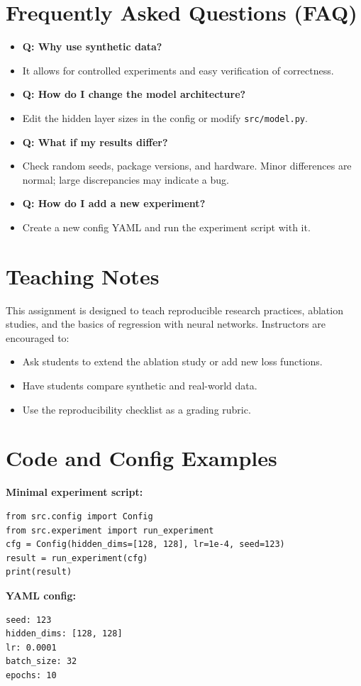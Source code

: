 \documentclass[11pt]{article}
\begin{document}
\section*{Frequently Asked Questions (FAQ)}
\begin{itemize}
  \item \textbf{Q: Why use synthetic data?}
  \item[A:] It allows for controlled experiments and easy verification of correctness.
  \item \textbf{Q: How do I change the model architecture?}
  \item[A:] Edit the hidden layer sizes in the config or modify \texttt{src/model.py}.
  \item \textbf{Q: What if my results differ?}
  \item[A:] Check random seeds, package versions, and hardware. Minor differences are normal; large discrepancies may indicate a bug.
  \item \textbf{Q: How do I add a new experiment?}
  \item[A:] Create a new config YAML and run the experiment script with it.
\end{itemize}

\section*{Teaching Notes}
This assignment is designed to teach reproducible research practices, ablation studies, and the basics of regression with neural networks. Instructors are encouraged to:
\begin{itemize}
  \item Ask students to extend the ablation study or add new loss functions.
  \item Have students compare synthetic and real-world data.
  \item Use the reproducibility checklist as a grading rubric.
\end{itemize}

\section*{Code and Config Examples}
\textbf{Minimal experiment script:}
\begin{verbatim}
from src.config import Config
from src.experiment import run_experiment
cfg = Config(hidden_dims=[128, 128], lr=1e-4, seed=123)
result = run_experiment(cfg)
print(result)
\end{verbatim}
\textbf{YAML config:}
\begin{verbatim}
seed: 123
hidden_dims: [128, 128]
lr: 0.0001
batch_size: 32
epochs: 10
\end{verbatim}
\end{document}
